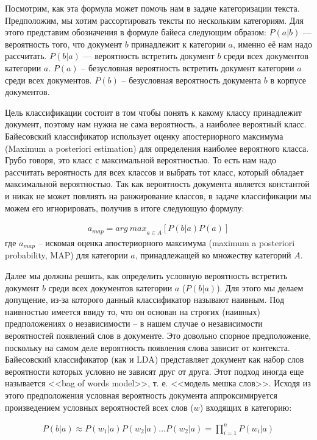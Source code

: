 Посмотрим, как эта формула может помочь нам в задаче категоризации текста. Предположим, мы хотим рассортировать тексты по нескольким категориям. Для этого представим обозначения в формуле байеса следующим образом:  $P(a|b)$ --- вероятность того, что документ $b$ принадлежит к категории $a$, именно её нам надо рассчитать. $P(b|a)$ --- вероятность встретить документ $b$ среди всех документов категории $a$. $P(a)$ -- безусловная вероятность встретить документ категории $a$ среди всех документов. $P(b)$ -- безусловная вероятность документа $b$ в корпусе документов.

Цель классификации состоит в том чтобы понять к какому классу принадлежит документ, поэтому нам нужна не сама вероятность, а наиболее вероятный класс. Байесовский классификатор использует оценку апостериорного максимума (Maximum a posteriori estimation) для определения наиболее вероятного класса. Грубо говоря, это класс с максимальной вероятностью. То есть нам надо рассчитать вероятность для всех классов и выбрать тот класс, который обладает максимальной вероятностью. Так как вероятность документа является константой и никак не может повлиять на ранжирование классов, в задаче классификации мы можем его игнорировать, получив в итоге следующую формулу:

\begin{eqnarray}\label{eq:map}
a_{map}={arg\ max}_{a\in A} [P(b|a)P(a)]
\end{eqnarray}
где $a_{map}$ -- искомая оценка апостериорного максимума (maximum a posteriori probability, MAP) для категории $a$, принадлежащей ко множеству категорий $A$.

Далее мы должны решить, как определить условную вероятность встретить документ $b$ среди всех документов категории $a$ ($P(b|a)$). Для этого мы делаем допущение, из-за которого данный классификатор называют наивным. Под наивностью имеется ввиду то, что он основан на строгих (наивных) предположениях о независимости -- в нашем случае о независимости вероятностей появлений слов в документе. Это довольно спорное предположение, поскольку на самом деле вероятность появления слова зависит от контекста. Байесовский классификатор (как и LDA) представляет документ как набор слов вероятности которых условно не зависят друг от друга. Этот подход иногда еще называется <<bag of words model>>, т. е. <<модель мешка слов>>. Исходя из этого предположения условная вероятность документа аппроксимируется произведением условных вероятностей всех слов ($w$) входящих в категорию:

\begin{eqnarray}
P(b|a) \approx P(w_1|a) P(w_2|a)\ldots P(w_2|a) = \prod_{i=1}^nP(w_i|a)
\end{eqnarray}

